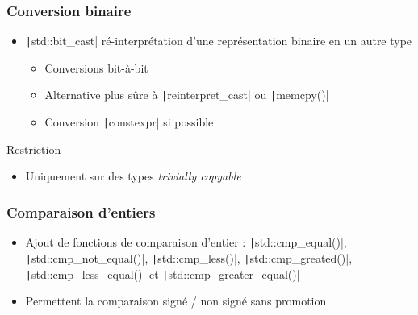 \documentclass[C++.tex]{subfiles}
\begin{document}
\begin{frame}[fragile]
	\frametitle{Conversion binaire}
	\begin{itemize}
		\item \texttt|std::bit_cast| ré-interprétation d'une représentation binaire en un autre type
		\begin{itemize}
			\item Conversions bit-à-bit
			\item Alternative plus sûre à \texttt|reinterpret_cast| ou \texttt|memcpy()|
			\item Conversion \texttt|constexpr| si possible
		\end{itemize}
	\end{itemize}

	\begin{alertblock}{Restriction}
		\begin{itemize}
			\item Uniquement sur des types \textit{trivially copyable}
		\end{itemize}
	\end{alertblock}
\end{frame}

\begin{frame}[fragile]
	\frametitle{Comparaison d'entiers}
	\begin{itemize}
		\item Ajout de fonctions de comparaison d'entier : \texttt|std::cmp_equal()|, \texttt|std::cmp_not_equal()|, \texttt|std::cmp_less()|, \texttt|std::cmp_greated()|, \texttt|std::cmp_less_equal()| et \texttt|std::cmp_greater_equal()|
		\item Permettent la comparaison signé / non signé sans promotion
	\end{itemize}
\end{frame}
\end{document}
